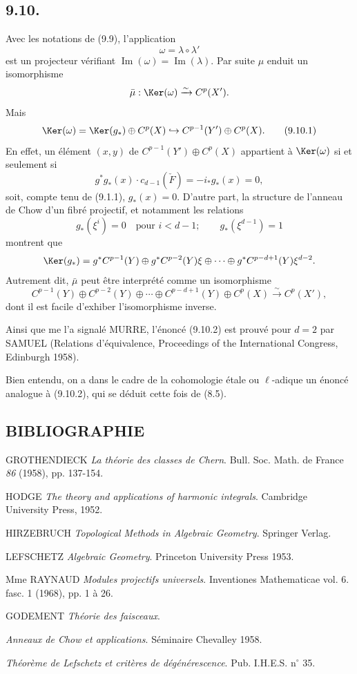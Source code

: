 \subsection*{9.10.}

Avec les notations de (9.9), l'application
\[
\omega=\lambda\circ\lambda'
\]
est un projecteur vérifiant $\operatorname{Im}(\omega)=\operatorname{Im}(\lambda)$. Par suite $\mu$ enduit un isomorphisme
\[
\bar\mu:\Ker(\omega)\xrightarrow{\sim}C^p(X').
\]
Mais
\[
\Ker(\omega)=\Ker(g_*)\oplus C^p(X)\hookrightarrow C^{p-1}(Y')\oplus C^p(X).
\tag{9.10.1}
\]
En effet, un élément $(x,y)$ de $C^{p-1}(Y')\oplus C^p(X)$ appartient à $\Ker(\omega)$ si et seulement si
\[
g^*g_*(x)\cdot c_{d-1}(\check F)=-i_*g_*(x)=0,
\]
soit, compte tenu de (9.1.1), $g_*(x)=0$. D'autre part, la structure de l'anneau de Chow d'un fibré projectif, et notamment les relations
\[
g_*(\xi^i)=0\quad\text{pour }i<d-1;\qquad g_*(\xi^{d-1})=1
\]
montrent que
\[
\Ker(g_*)=g^*C^{p-1}(Y)\oplus g^*C^{p-2}(Y)\xi\oplus\cdots\oplus g^*C^{p-d+1}(Y)\xi^{d-2}.
\]
Autrement dit, $\bar\mu$ peut être interprété comme un isomorphisme
\[
C^{p-1}(Y)\oplus C^{p-2}(Y)\oplus\cdots\oplus C^{p-d+1}(Y)\oplus C^p(X)
\xrightarrow{\sim}C^p(X'),
\tag{9.10.2}
\]
dont il est facile d'exhiber l'isomorphisme inverse.

Ainsi que me l'a signalé MURRE, l'énoncé (9.10.2) est prouvé pour $d=2$ par SAMUEL (Relations d'équivalence, Proceedings of the International Congress, Edinburgh 1958).

Bien entendu, on a dans le cadre de la cohomologie étale ou $\ell$-adique un énoncé analogue à (9.10.2), qui se déduit cette fois de (8.5).

\subsection*{BIBLIOGRAPHIE}

\begin{enumerate}[label={[\arabic*]}]
\item GROTHENDIECK \emph{La théorie des classes de Chern}. Bull. Soc. Math. de France \emph{86} (1958), pp. 137-154.
\item HODGE \emph{The theory and applications of harmonic integrals}. Cambridge University Press, 1952.
\item HIRZEBRUCH \emph{Topological Methods in Algebraic Geometry}. Springer Verlag.
\item LEFSCHETZ \emph{Algebraic Geometry}. Princeton University Press 1953.
\item Mme RAYNAUD \emph{Modules projectifs universels}. Inventiones Mathematicae vol. 6. fasc. 1 (1968), pp. 1 à 26.
\item[{[TF]}] GODEMENT \emph{Théorie des faisceaux}.
\item[{[CH]}] \emph{Anneaux de Chow et applications}. Séminaire Chevalley 1958.
\item[{[6]}] \emph{Théorème de Lefschetz et critères de dégénérescence}. Pub. I.H.E.S. n$^\circ$ 35.
\end{enumerate}



